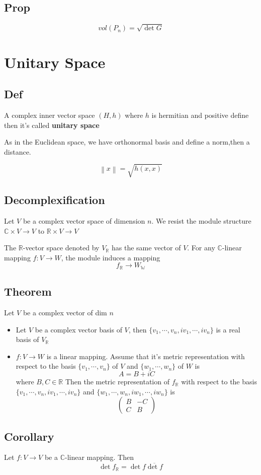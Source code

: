 \documentclass{book}
\newcommand{\norm}[1]{\left\lVert #1 \right\rVert}
\begin{document}
\section{Prop}
$$vol(P_n)=\sqrt{\det G}$$
\chapter{Unitary Space}
\section{Def}
A complex inner vector space $(H,h)$ where $h$ is hermitian and positive define then it's called \textbf{unitary space}

As in the Euclidean space, we have orthonormal basis and define a norm,then a distance.

$$\norm{x}=\sqrt{h(x,x)}$$
\section{Decomplexification}
Let $V$ be a complex vector space of dimension $n$. We resist the module structure $\mathbb{C}\times V\rightarrow V$ to $\mathbb{R}\times V\rightarrow V$

The $\mathbb{R}$-vector space denoted by $V_\mathbb{R}$ has the same vector of $V$. For any $\mathbb{C}$-linear mapping $f:V\rightarrow W$, the module induces a mapping $$f_\mathbb{R}\rightarrow W_\mathbb{W}$$
\section{Theorem}
Let $V$ be a complex vector of dim $n$
\begin{itemize}
    \item Let $V$ be a complex vector basis of $V$, then $\{v_1,\cdots, v_n,iv_1,\cdots, iv_n\}$ is a real basis of $V_\mathbb{R}$
    \item $f:V\rightarrow W$ is a linear mapping. Assume that it's metric representation with respect to the basis $\{v_1,\cdots, v_n\}$ of $V$ and $\{w_1,\cdots, w_n\}$ of $W$ is $$A=B+iC$$
    where $B,C\in\mathbb{R}$ Then the metric representation of $f_\mathbb{R}$ with respect to the basis $\{v_1,\cdots, v_n,iv_1,\cdots, iv_n\}$ and $\{w_1,\cdots, w_n,iw_1,\cdots, iw_n\}$ is$$\begin{pmatrix}
        B&-C\\C&B
    \end{pmatrix}$$
\end{itemize}
\section{Corollary}
Let $f:V\rightarrow V$ be a $\mathbb{C}$-linear mapping. Then$$\det f_\mathbb{R}=\det f\overline{\det f}$$
\end{document}
